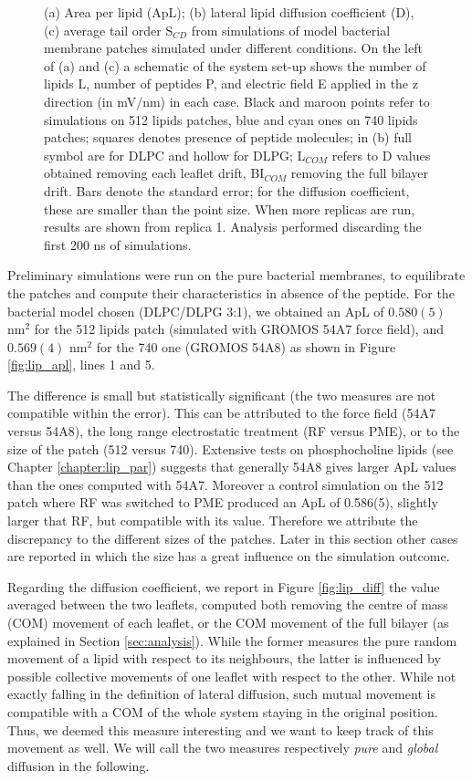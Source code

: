 \begin{figure}
\caption[ApL, D and S$_{CD}$ for membrane simulations]{(a) Area per lipid (ApL); (b) lateral lipid diffusion coefficient (D), (c) average tail order S$_{CD}$ from simulations of model bacterial membrane patches simulated under different conditions. On the left of (a) and (c) a schematic of the system set-up shows the number of lipids L, number of peptides P, and electric field E applied in the z direction (in mV/nm) in each case. Black and maroon points refer to simulations on 512 lipids patches, blue and cyan ones on 740 lipids patches; squares denotes presence of peptide molecules; in (b) full symbol are for DLPC and hollow for DLPG; L$_{COM}$ refers to D values obtained removing each leaflet drift, BI$_{COM}$ removing the full bilayer drift. Bars denote the standard error; for the diffusion coefficient, these are smaller than the point size. When more replicas are run, results are shown from replica 1. Analysis performed discarding the first 200 ns of simulations.}
\label{fig:lipids_ApL_D}
\end{figure}

Preliminary simulations were run on the pure bacterial membranes, to equilibrate the patches and compute their characteristics in absence of the peptide.
%
For the bacterial model chosen (DLPC/DLPG 3:1), we obtained an ApL of $0.580(5)$ nm$^2$ for the 512 lipids patch (simulated with GROMOS 54A7 force field), and  $0.569(4)$ nm$^2$ for the 740 one (GROMOS 54A8) as shown in Figure \ref{fig:lip_apl}, lines 1 and 5.

The difference is small but statistically significant (the two measures are not compatible within the error).
%
This can be attributed to the force field (54A7 versus 54A8), the long range electrostatic treatment (RF versus PME), or to the size of the patch (512 versus 740). %
%
Extensive tests on phosphocholine lipids (see Chapter \ref{chapter:lip_par}) suggests that generally 54A8 gives larger ApL values than the ones computed with 54A7.
%
Moreover a control simulation on the 512 patch where RF was switched to PME produced an ApL of 0.586(5), slightly larger that RF, but compatible with its value.
%
Therefore we attribute the discrepancy to the different sizes of the patches. Later in this section other cases are reported in which the size has a great influence on the simulation outcome.

Regarding the diffusion coefficient, we report in Figure \ref{fig:lip_diff} the value averaged between the two leaflets, computed both removing the centre of mass (COM) movement of each leaflet, or the COM movement of the full bilayer (as explained in Section \ref{sec:analysis}). While the former measures the pure random movement of a lipid with respect to its neighbours, the latter is influenced by possible collective movements of one leaflet with respect to the other. While not exactly falling in the definition of lateral diffusion, such mutual movement is compatible with a COM of the whole system staying in the original position. Thus, we deemed this measure interesting and we want to keep track of this movement as well. We will call the two measures respectively \emph{pure} and \emph{global} diffusion in the following.


